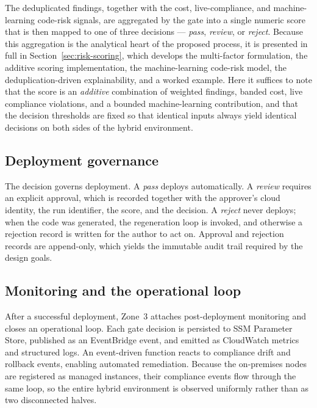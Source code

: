 The deduplicated findings, together with the cost, live-compliance, and
machine-learning code-risk signals, are aggregated by the gate into a single numeric
score that is then mapped to one of three decisions --- \emph{pass}, \emph{review}, or
\emph{reject}. Because this aggregation is the analytical heart of the proposed process,
it is presented in full in Section~\ref{sec:risk-scoring}, which develops the multi-factor
formulation, the additive scoring implementation, the machine-learning code-risk model,
the deduplication-driven explainability, and a worked example. Here it suffices to note
that the score is an \emph{additive} combination of weighted findings, banded cost, live
compliance violations, and a bounded machine-learning contribution, and that the decision
thresholds are fixed so that identical inputs always yield identical decisions on both
sides of the hybrid environment.

\subsection{Deployment governance}
\label{subsec:method-governance}

The decision governs deployment. A \emph{pass} deploys automatically. A \emph{review}
requires an explicit approval, which is recorded together with the approver's cloud
identity, the run identifier, the score, and the decision. A \emph{reject} never
deploys; when the code was generated, the regeneration loop is invoked, and otherwise a
rejection record is written for the author to act on. Approval and rejection records are
append-only, which yields the immutable audit trail required by the design goals.

\subsection{Monitoring and the operational loop}
\label{subsec:method-monitoring}

After a successful deployment, Zone~3 attaches post-deployment monitoring and closes an
operational loop. Each gate decision is persisted to SSM Parameter Store, published as an
EventBridge event, and emitted as CloudWatch metrics and structured logs. An
event-driven function reacts to compliance drift and rollback events, enabling automated
remediation. Because the on-premises nodes are registered as managed instances, their
compliance events flow through the same loop, so the entire hybrid environment is
observed uniformly rather than as two disconnected halves.
